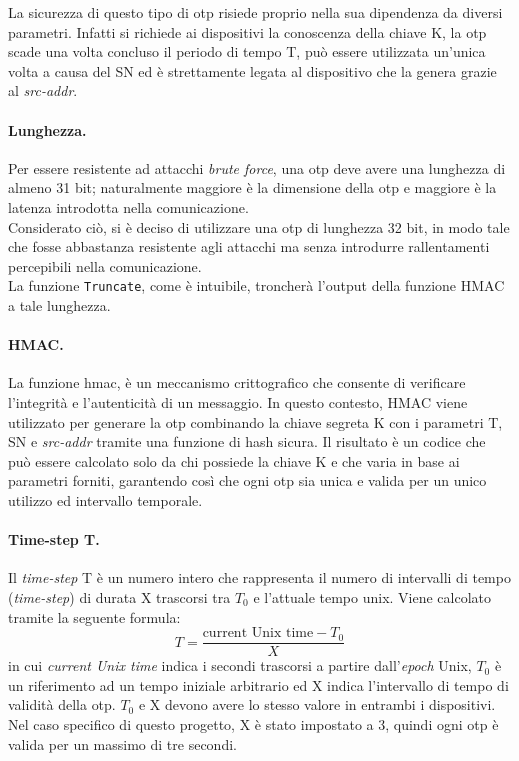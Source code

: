 La sicurezza di questo tipo di \gls{otp} risiede proprio nella sua dipendenza da diversi parametri. Infatti si richiede ai dispositivi la conoscenza della chiave K, la \gls{otp} scade una volta concluso il periodo di tempo T, può essere utilizzata un'unica volta a causa del SN ed è strettamente legata al dispositivo che la genera grazie al \textit{src-addr}.

\paragraph{Lunghezza.}
Per essere resistente ad attacchi \textit{brute force}, una \gls{otp} deve avere una lunghezza di almeno 31 bit; naturalmente maggiore è la dimensione della \gls{otp} e maggiore è la latenza introdotta nella comunicazione.\\
Considerato ciò, si è deciso di utilizzare una \gls{otp} di lunghezza 32 bit, in modo tale che fosse abbastanza resistente agli attacchi ma senza introdurre rallentamenti percepibili nella comunicazione.\\
La funzione \texttt{Truncate}, come è intuibile, troncherà l'output della funzione HMAC a tale lunghezza.

\paragraph{HMAC.}
La funzione \gls{hmac}\glsfirstoccur, è un meccanismo crittografico che consente di verificare l'integrità e l'autenticità di un messaggio. In questo contesto, HMAC viene utilizzato per generare la \gls{otp} combinando la chiave segreta K con i parametri T, SN e \textit{src-addr} tramite una funzione di hash sicura. Il risultato è un codice che può essere calcolato solo da chi possiede la chiave K e che varia in base ai parametri forniti, garantendo così che ogni \gls{otp} sia unica e valida per un unico utilizzo ed intervallo temporale.

\paragraph{Time-step T.}
Il \textit{time-step} T è un numero intero che rappresenta il numero di intervalli di tempo (\textit{time-step}) di durata X trascorsi tra $T_0$ e l'attuale tempo unix. Viene calcolato tramite la seguente formula:
\begin{equation}
    T = \frac{\text{current Unix time} - T_0}{X}
    \label{eq:timestep}
\end{equation}
in cui \textit{current Unix time} indica i secondi trascorsi a partire dall'\textit{epoch} Unix, $T_0$ è un riferimento ad un tempo iniziale arbitrario ed X indica l'intervallo di tempo di validità della \gls{otp}. $T_0$ e X devono avere lo stesso valore in entrambi i dispositivi.\\
Nel caso specifico di questo progetto, X è stato impostato a 3, quindi ogni \gls{otp} è valida per un massimo di tre secondi.


